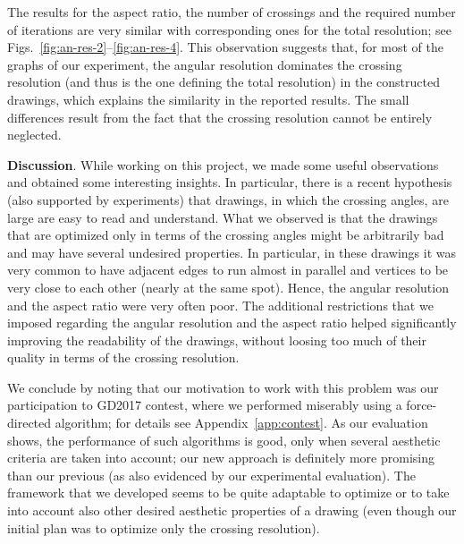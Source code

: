 \documentclass[runningheads]{llncs}
\newcommand{\myparagraph}[1]{\smallskip\noindent\textbf{#1}.}
\begin{document}
The results for the aspect ratio, the number of crossings and the required number of iterations are very similar with corresponding ones for the total resolution; see Figs.~\ref{fig:an-res-2}--\ref{fig:an-res-4}. This observation suggests that, for most of the graphs of our experiment, the angular resolution dominates the crossing resolution (and thus is the one defining the total resolution) in the constructed drawings, which explains the similarity in the reported results. The small differences result from the fact that the crossing resolution cannot be entirely neglected.

\myparagraph{Discussion}
%
%
%
While working on this project, we made some useful observations and  obtained some interesting insights. In particular, there is a recent hypothesis (also supported by experiments) that drawings, in which the crossing angles, are large are easy to read and understand. What we observed is that the drawings that are optimized only in terms of the crossing angles might be arbitrarily bad and may have several undesired properties. In particular, in these drawings it was very common to have adjacent edges to run almost in parallel and vertices to be very close to each other (nearly at the same spot). Hence, the angular resolution and the aspect ratio were very often poor. The additional restrictions that we imposed regarding the angular resolution and the aspect ratio helped significantly improving the readability of the drawings, without loosing too much of their quality in terms of the crossing resolution.

We conclude by noting that our motivation to work with this problem was our participation to GD2017 contest, where we performed miserably using a force-directed algorithm; for details see Appendix~\ref{app:contest}. As our evaluation shows, the performance of such algorithms is good, only when several aesthetic criteria are taken into account; our new approach is definitely more promising than our previous (as also evidenced by our experimental evaluation). The framework that we developed seems to be quite adaptable to optimize or to take into account also other desired aesthetic properties of a drawing (even though our initial plan was to optimize only the crossing resolution).
\end{document}
